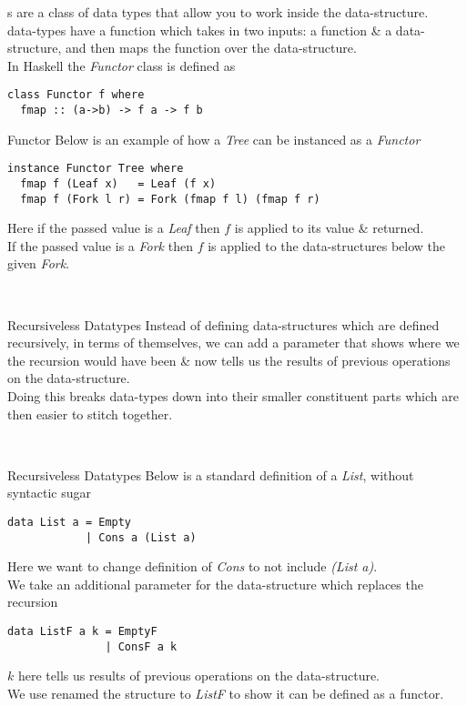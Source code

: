\documentclass[11pt,a4paper]{article}
\begin{document}
\begin{definition}{{}}
{}s are a class of data types that allow you to work inside the data-structure.\\
{} data-types have a function which takes in two inputs: a function \& a {} data-structure, and then maps the function over the data-structure.\\
In Haskell the \textit{Functor} class is defined as
\begin{lstlisting}
class Functor f where
  fmap :: (a->b) -> f a -> f b
\end{lstlisting}
\end{definition}

\begin{example}{Functor}
Below is an example of how a \textit{Tree} can be instanced as a \textit{Functor}
\begin{lstlisting}
instance Functor Tree where
  fmap f (Leaf x)   = Leaf (f x)
  fmap f (Fork l r) = Fork (fmap f l) (fmap f r)
\end{lstlisting}
Here if the passed value is a \textit{Leaf} then $f$ is applied to its value \& returned.\\
If the passed value is a \textit{Fork} then $f$ is applied to the data-structures below the given \textit{Fork}.
\end{example}\\

\begin{remark}{Recursiveless Datatypes}
Instead of defining data-structures which are defined recursively, in terms of themselves, we can add a parameter that shows where we the recursion would have been \& now tells us the results of previous operations on the data-structure.\\
Doing this breaks data-types down into their smaller constituent parts which are then easier to stitch together.
\end{remark}\\

\begin{example}{Recursiveless Datatypes}
Below is a standard definition of a \textit{List}, without syntactic sugar
\begin{lstlisting}
data List a = Empty
            | Cons a (List a)
\end{lstlisting}
Here we want to change definition of \textit{Cons} to not include \textit{(List a)}.\\
We take an additional parameter for the data-structure which replaces the recursion
\begin{lstlisting}
data ListF a k = EmptyF
               | ConsF a k
\end{lstlisting}
$k$ here tells us results of previous operations on the data-structure.\\
\NB We use renamed the structure to \textit{ListF} to show it can be defined as a functor.
\end{example}\\
\end{document}
